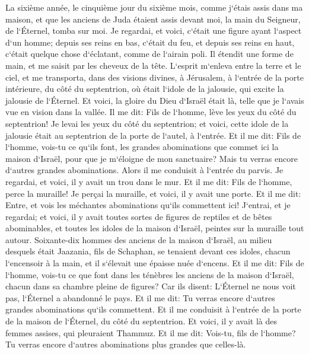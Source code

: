 \verse La sixième année, le cinquième jour du sixième mois, comme j`étais assis dans ma maison, et que les anciens de Juda étaient assis devant moi, la main du Seigneur, de l`Éternel, tomba sur moi. 
\verse Je regardai, et voici, c`était une figure ayant l`aspect d`un homme; depuis ses reins en bas, c`était du feu, et depuis ses reins en haut, c`était quelque chose d`éclatant, comme de l`airain poli. 
\verse Il étendit une forme de main, et me saisit par les cheveux de la tête. L`esprit m`enleva entre la terre et le ciel, et me transporta, dans des visions divines, à Jérusalem, à l`entrée de la porte intérieure, du côté du septentrion, où était l`idole de la jalousie, qui excite la jalousie de l`Éternel. 
\verse Et voici, la gloire du Dieu d`Israël était là, telle que je l`avais vue en vision dans la vallée. 
\verse Il me dit: Fils de l`homme, lève les yeux du côté du septentrion! Je levai les yeux du côté du septentrion; et voici, cette idole de la jalousie était au septentrion de la porte de l`autel, à l`entrée. 
\verse Et il me dit: Fils de l`homme, vois-tu ce qu`ils font, les grandes abominations que commet ici la maison d`Israël, pour que je m`éloigne de mon sanctuaire? Mais tu verras encore d`autres grandes abominations. 
\verse Alors il me conduisit à l`entrée du parvis. Je regardai, et voici, il y avait un trou dans le mur. 
\verse Et il me dit: Fils de l`homme, perce la muraille! Je perçai la muraille, et voici, il y avait une porte. 
\verse Et il me dit: Entre, et vois les méchantes abominations qu`ils commettent ici! 
\verse J`entrai, et je regardai; et voici, il y avait toutes sortes de figures de reptiles et de bêtes abominables, et toutes les idoles de la maison d`Israël, peintes sur la muraille tout autour. 
\verse Soixante-dix hommes des anciens de la maison d`Israël, au milieu desquels était Jaazania, fils de Schaphan, se tenaient devant ces idoles, chacun l`encensoir à la main, et il s`élevait une épaisse nuée d`encens. 
\verse Et il me dit: Fils de l`homme, vois-tu ce que font dans les ténèbres les anciens de la maison d`Israël, chacun dans sa chambre pleine de figures? Car ils disent: L`Éternel ne nous voit pas, l`Éternel a abandonné le pays. 
\verse Et il me dit: Tu verras encore d`autres grandes abominations qu`ils commettent. 
\verse Et il me conduisit à l`entrée de la porte de la maison de l`Éternel, du côté du septentrion. Et voici, il y avait là des femmes assises, qui pleuraient Thammuz. 
\verse Et il me dit: Vois-tu, fils de l`homme? Tu verras encore d`autres abominations plus grandes que celles-là. 
